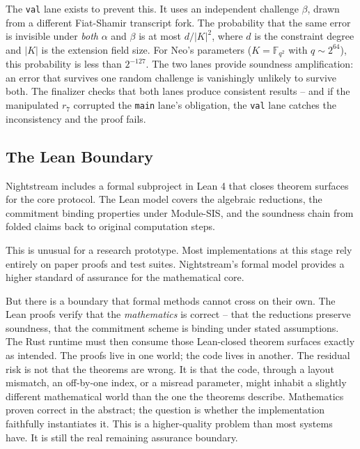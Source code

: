 \documentclass[
  11pt,
  openany]{report}
\begin{document}
The \texttt{val} lane exists to prevent this. It uses an independent challenge
\(\beta\), drawn from a different Fiat-Shamir transcript fork. The probability
that the same error is invisible under \emph{both} \(\alpha\) and \(\beta\) is
at most \(d/|K|^2\), where \(d\) is the constraint degree and \(|K|\) is the
extension field size. For Neo's parameters (\(K = \mathbb{F}_{q^2}\) with
\(q \sim 2^{64}\)), this probability is less than \(2^{-127}\). The two lanes
provide soundness amplification: an error that survives one random challenge is
vanishingly unlikely to survive both. The finalizer checks that both lanes
produce consistent results -- and if the manipulated \(r_7\) corrupted the
\texttt{main} lane's obligation, the \texttt{val} lane catches the inconsistency
and the proof fails.

\subsection{The Lean Boundary}\label{the-lean-boundary}

Nightstream includes a formal subproject in Lean 4 that closes theorem surfaces
for the core protocol. The Lean model covers the algebraic reductions, the
commitment binding properties under Module-SIS, and the soundness chain from
folded claims back to original computation steps.

This is unusual for a research prototype. Most implementations at this stage
rely entirely on paper proofs and test suites. Nightstream's formal model
provides a higher standard of assurance for the mathematical core.

But there is a boundary that formal methods cannot cross on their own. The Lean
proofs verify that the \emph{mathematics} is correct -- that the reductions
preserve soundness, that the commitment scheme is binding under stated
assumptions. The Rust runtime must then consume those Lean-closed theorem
surfaces exactly as intended. The proofs live in one world; the code lives in
another. The residual risk is not that the theorems are wrong. It is that the
code, through a layout mismatch, an off-by-one index, or a misread parameter,
might inhabit a slightly different mathematical world than the one the theorems
describe. Mathematics proven correct in the abstract; the question is whether
the implementation faithfully instantiates it. This is a higher-quality problem
than most systems have. It is still the real remaining assurance boundary.
\end{document}
